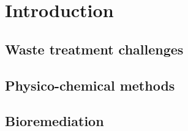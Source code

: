 \documentclass[../main/main]{subfiles}
\begin{document}
\chapter*{Introduction}


\section*{Waste treatment challenges}

\section*{Physico-chemical methods}

\section*{Bioremediation}
\end{document}
